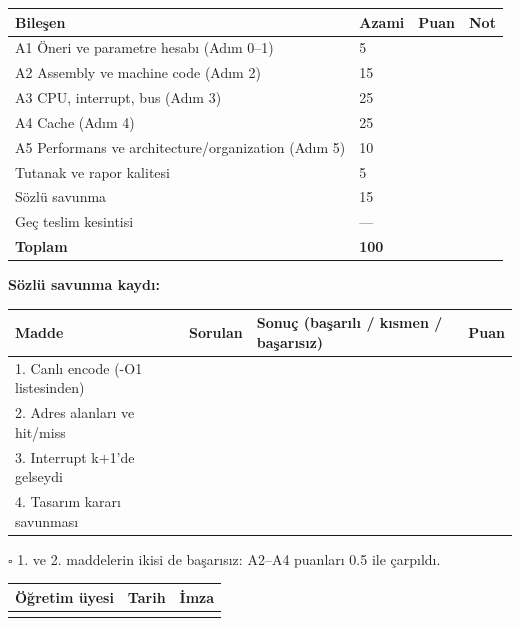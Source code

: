 \documentclass[11pt,a4paper]{article}
\newcommand{\hd}[1]{\cellcolor{hdr}#1}
\begin{document}
\begin{longtable}{|p{8.4cm}|p{2.0cm}|p{2.0cm}|p{2.4cm}|}
\hline
\hd{Bileşen} & \hd{Azami} & \hd{Puan} & \hd{Not}\\
\hline
A1 Öneri ve parametre hesabı (Adım 0--1) & 5 & & \\ \hline
A2 Assembly ve machine code (Adım 2) & 15 & & \\ \hline
A3 CPU, interrupt, bus (Adım 3) & 25 & & \\ \hline
A4 Cache (Adım 4) & 25 & & \\ \hline
A5 Performans ve architecture/organization (Adım 5) & 10 & & \\ \hline
Tutanak ve rapor kalitesi & 5 & & \\ \hline
Sözlü savunma & 15 & & \\ \hline
Geç teslim kesintisi & --- & & \\ \hline
\textbf{Toplam} & \textbf{100} & & \\ \hline
\end{longtable}

\textbf{Sözlü savunma kaydı:}

\begin{longtable}{|p{6.0cm}|p{2.0cm}|p{5.0cm}|p{1.8cm}|}
\hline
\hd{Madde} & \hd{Sorulan} & \hd{Sonuç (başarılı / kısmen / başarısız)} & \hd{Puan}\\
\hline
1. Canlı encode (-O1 listesinden) & & & \\ \hline
2. Adres alanları ve hit/miss & & & \\ \hline
3. Interrupt k$+$1'de gelseydi & & & \\ \hline
4. Tasarım kararı savunması & & & \\ \hline
\end{longtable}

$\square$ 1. ve 2. maddelerin ikisi de başarısız: A2--A4 puanları 0.5 ile çarpıldı.

\begin{longtable}{|p{7.6cm}|p{3.6cm}|p{3.6cm}|}
\hline
\hd{Öğretim üyesi} & \hd{Tarih} & \hd{İmza}\\
\hline
 & & \\ \hline
\end{longtable}
\end{document}
